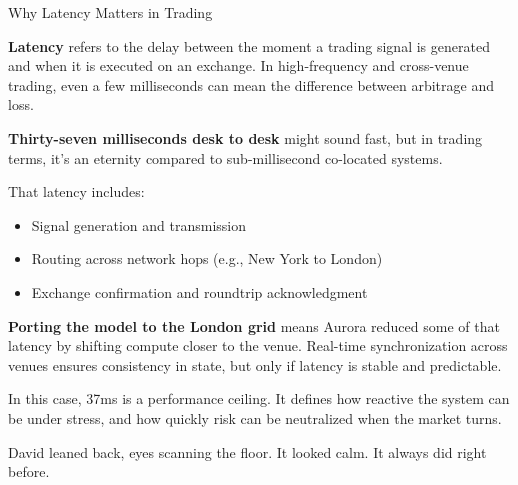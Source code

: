 \medskip

\begin{TechnicalSidebar}{Why Latency Matters in Trading}

  \textbf{Latency} refers to the delay between the moment a trading signal is generated and when it 
  is executed on an exchange.  
  In high-frequency and cross-venue trading, even a few milliseconds can mean the difference 
  between arbitrage and loss.

  \medskip

  \textbf{Thirty-seven milliseconds desk to desk} might sound fast, but in trading terms, it’s an eternity 
  compared to sub-millisecond co-located systems.  

  \medskip

  That latency includes:

  \begin{itemize}
    \item Signal generation and transmission
    \item Routing across network hops (e.g., New York to London)
    \item Exchange confirmation and roundtrip acknowledgment
  \end{itemize}

  \medskip

  \textbf{Porting the model to the London grid} means Aurora reduced some of that latency by 
  shifting compute closer to the venue.  
  Real-time synchronization across venues ensures consistency in state, but only if latency 
  is stable and predictable.

  \medskip

  In this case, 37ms is a performance ceiling.  
  It defines how reactive the system can be under stress, and how quickly risk can be 
  neutralized when the market turns.

\end{TechnicalSidebar}

\medskip

David leaned back, eyes scanning the floor. It looked calm.
It always did right before.



